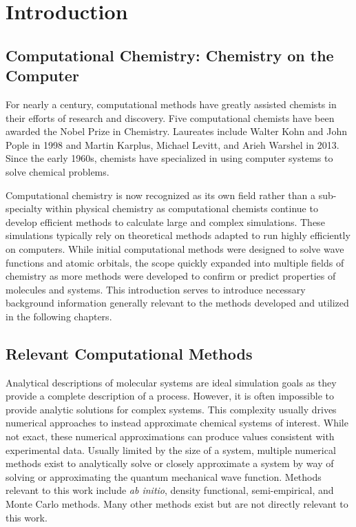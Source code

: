 \chapter{Introduction}
\label{ch:Introduction}

\section{Computational Chemistry: Chemistry on the Computer}

For nearly a century, computational methods have greatly assisted chemists in their efforts of research and discovery.
Five computational chemists have been awarded the Nobel Prize in Chemistry. 
Laureates include Walter Kohn and John Pople in 1998 and Martin Karplus, Michael Levitt, and Arieh Warshel in 2013.
Since the early 1960s, chemists have specialized in using computer systems to solve chemical problems.

Computational chemistry is now recognized as its own field rather than a sub-specialty within physical chemistry as computational chemists continue to develop efficient methods to calculate large and complex simulations.
These simulations typically rely on theoretical methods adapted to run highly efficiently on computers.
While initial computational methods were designed to solve wave functions and atomic orbitals, the scope quickly expanded into multiple fields of chemistry as more methods were developed to confirm or predict properties of molecules and systems.\citep{PopleSTO, GaussianOrbitals,GAMESS}
This introduction serves to introduce necessary background information generally relevant to the methods developed and utilized in the following chapters.

\section{Relevant Computational Methods}

Analytical descriptions of molecular systems are ideal simulation goals as they provide a complete description of a process.
However, it is often impossible to provide analytic solutions for complex systems.
This complexity usually drives numerical approaches to instead approximate chemical systems of interest.
While not exact, these numerical approximations can produce values consistent with experimental data.
Usually limited by the size of a system, multiple numerical methods exist to analytically solve or closely approximate a system by way of solving or approximating the quantum mechanical wave function.
Methods relevant to this work include \textit{ab initio}, density functional, semi-empirical, and Monte Carlo methods.
Many other methods exist but are not directly relevant to this work.


